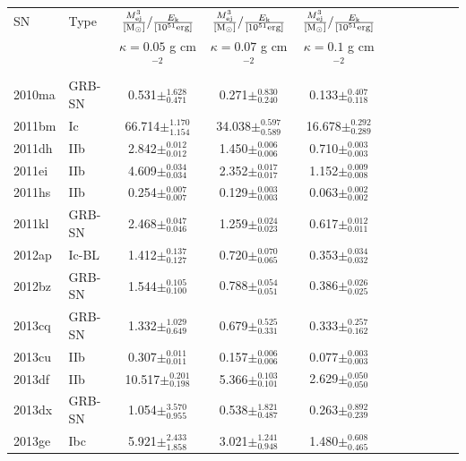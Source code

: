 \documentclass[a4paper,fleqn,usenatbib]{mnras}
\begin{document}
\begin{table}
\renewcommand{\arraystretch}{1.5}
 \centering
 \begin{minipage}{140mm}
 \begin{tabular}{@{}llcccccclcc@{}}
  \hline
  SN & Type & $\frac{M_{\mathrm{ej}}^3}{[{\rm M}_\odot]}/ \frac{E_{\mathrm{k}}}{[10^{51}\mathrm{ erg}]}$  & $\frac{M_{\mathrm{ej}}^3}{[{\rm M}_\odot]}/ \frac{E_{\mathrm{k}}}{[10^{51}\mathrm{ erg}]}$ & $\frac{M_{\mathrm{ej}}^3}{[{\rm M}_\odot]}/ \frac{E_{\mathrm{k}}}{[10^{51}\mathrm{ erg}]}$ &  \\
 & & $\kappa = 0.05$ g cm$^{-2}$ & $\kappa = 0.07$ g cm$^{-2}$ & $\kappa = 0.1$ g cm$^{-2}$ \\
  \hline
2010ma & GRB-SN & 0.531$ \pm^{1.628}_{0.471}$ &0.271$ \pm^{0.830}_{0.240}$ &0.133$ \pm^{0.407}_{0.118}$ \\
2011bm & Ic & 66.714$ \pm^{1.170}_{1.154}$ &34.038$ \pm^{0.597}_{0.589}$ &16.678$ \pm^{0.292}_{0.289}$ \\
2011dh & IIb & 2.842$ \pm^{0.012}_{0.012}$ &1.450$ \pm^{0.006}_{0.006}$ &0.710$ \pm^{0.003}_{0.003}$ \\
2011ei & IIb & 4.609$ \pm^{0.034}_{0.034}$ &2.352$ \pm^{0.017}_{0.017}$ &1.152$ \pm^{0.009}_{0.008}$ \\
2011hs & IIb & 0.254$ \pm^{0.007}_{0.007}$ &0.129$ \pm^{0.003}_{0.003}$ &0.063$ \pm^{0.002}_{0.002}$ \\
2011kl & GRB-SN & 2.468$ \pm^{0.047}_{0.046}$ &1.259$ \pm^{0.024}_{0.023}$ &0.617$ \pm^{0.012}_{0.011}$ \\
2012ap & Ic-BL & 1.412$ \pm^{0.137}_{0.127}$ &0.720$ \pm^{0.070}_{0.065}$ &0.353$ \pm^{0.034}_{0.032}$ \\
2012bz & GRB-SN & 1.544$ \pm^{0.105}_{0.100}$ &0.788$ \pm^{0.054}_{0.051}$ &0.386$ \pm^{0.026}_{0.025}$ \\
2013cq & GRB-SN & 1.332$ \pm^{1.029}_{0.649}$ &0.679$ \pm^{0.525}_{0.331}$ &0.333$ \pm^{0.257}_{0.162}$ \\
2013cu & IIb & 0.307$ \pm^{0.011}_{0.011}$ &0.157$ \pm^{0.006}_{0.006}$ &0.077$ \pm^{0.003}_{0.003}$ \\
2013df & IIb & 10.517$ \pm^{0.201}_{0.198}$ &5.366$ \pm^{0.103}_{0.101}$ &2.629$ \pm^{0.050}_{0.050}$ \\
2013dx & GRB-SN & 1.054$ \pm^{3.570}_{0.955}$ &0.538$ \pm^{1.821}_{0.487}$ &0.263$ \pm^{0.892}_{0.239}$ \\
2013ge & Ibc & 5.921$ \pm^{2.433}_{1.858}$ &3.021$ \pm^{1.241}_{0.948}$ &1.480$ \pm^{0.608}_{0.465}$ \\

\end{tabular}
\end{minipage}
\end{table}
\end{document}
